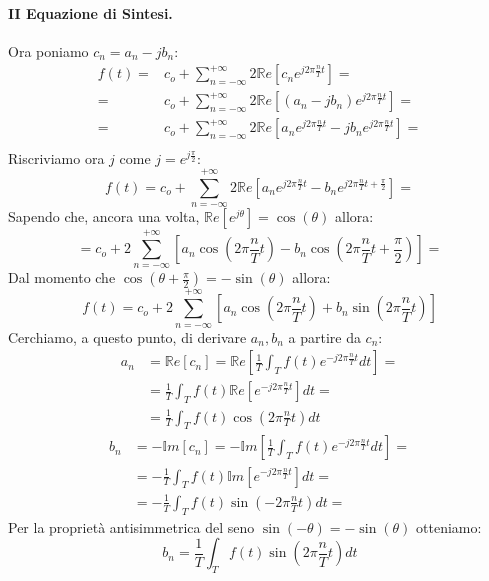 \paragraph{II Equazione di Sintesi.} Ora poniamo $c_n = a_n - jb_n$:
\begin{align*}
    f(t) =& c_o + \sum_{n = -\infty}^{+\infty} 2\mathbb{R}e \left[c_n e^{j2\pi \frac{n}{T}t}\right] =\\
         =& c_o + \sum_{n = -\infty}^{+\infty} 2\mathbb{R}e \left[(a_n - jb_n) e^{j2\pi \frac{n}{T}t}\right] =\\
         =& c_o + \sum_{n = -\infty}^{+\infty} 2\mathbb{R}e \left[a_n e^{j2\pi \frac{n}{T}t} - jb_n e^{j2\pi \frac{n}{T}t}\right] =\\
\end{align*}
Riscriviamo ora $j$ come $j = e^{j \frac{\pi}{2}}$:
\begin{equation*}
    f(t) = c_o + \sum_{n = -\infty}^{+\infty} 2\mathbb{R}e \left[a_n e^{j2\pi \frac{n}{T}t} - b_n e^{j2\pi \frac{n}{T}t + \frac{\pi}{2}}\right] =
\end{equation*}
Sapendo che, ancora una volta, $\mathbb{R}e[e^{j\theta}] = \cos(\theta)$ allora:
\begin{equation*}
    = c_o + 2\sum_{n = -\infty}^{+\infty} \left[a_n \cos\left(2\pi \frac{n}{T}t\right) - b_n \cos\left(2\pi \frac{n}{T}t + \frac{\pi}{2}\right)\right] =
\end{equation*}
Dal momento che $\cos\left(\theta + \frac{\pi}{2}\right) = -\sin(\theta)$ allora:
\begin{equation}
    f(t) = c_o + 2\sum_{n = -\infty}^{+\infty} \left[a_n \cos\left(2\pi \frac{n}{T}t\right) + b_n \sin\left(2\pi \frac{n}{T}t\right)\right]
\end{equation}
Cerchiamo, a questo punto, di derivare $a_n, b_n$ a partire da $c_n$:
\begin{align*}
    a_n &= \mathbb{R}e[c_n] = \mathbb{R}e\left[ \frac{1}{T} \int_{T} f(t) e^{-j2\pi \frac{n}{T} t} dt \right] =\\
        &= \frac{1}{T} \int_{T} f(t) \mathbb{R}e\left[e^{-j2\pi \frac{n}{T} t}\right] dt =\\
        &= \frac{1}{T} \int_{T} f(t) \cos\left(2\pi \frac{n}{T}t\right)dt
\end{align*}
\begin{align*}
    b_n &= -\mathbb{I}m[c_n] = -\mathbb{I}m\left[ \frac{1}{T} \int_{T} f(t) e^{-j2\pi \frac{n}{T} t} dt \right] =\\
        &= -\frac{1}{T} \int_{T} f(t) \mathbb{I}m\left[e^{-j2\pi \frac{n}{T} t}\right] dt =\\
        &= -\frac{1}{T} \int_{T} f(t) \sin\left(-2\pi \frac{n}{T}t\right)dt =       
\end{align*}
Per la proprietà antisimmetrica del seno $\sin(-\theta) = -\sin(\theta)$ otteniamo:
\begin{equation*}
   b_n = \frac{1}{T} \int_{T} f(t) \sin\left(2\pi \frac{n}{T}t\right)dt 
\end{equation*}

